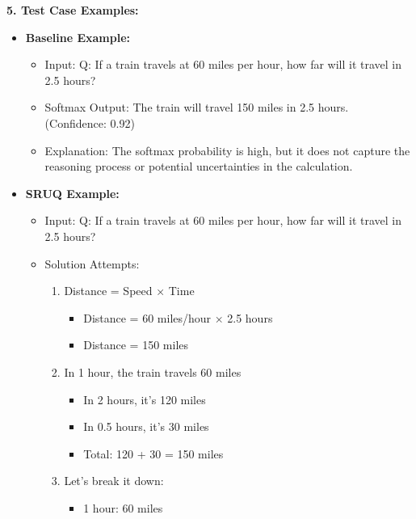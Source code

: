 \newpage


\begin{tcolorbox}[colback=blue!5!white,colframe=blue!75!black,title=\textbf{Semantic Resonance Uncertainty Quantification (SRUQ) (Part 3)}]
\small 
    \textbf{5. Test Case Examples:}
    \begin{itemize}
        \item \textbf{Baseline Example:}
        \begin{itemize}
            \item Input: Q: If a train travels at 60 miles per hour, how far will it travel in 2.5 hours?
            \item Softmax Output: The train will travel 150 miles in 2.5 hours. (Confidence: 0.92)
            \item Explanation: The softmax probability is high, but it does not capture the reasoning process or potential uncertainties in the calculation.
        \end{itemize}
        \item \textbf{SRUQ Example:}
        \begin{itemize}
            \item Input: Q: If a train travels at 60 miles per hour, how far will it travel in 2.5 hours?
            \item Solution Attempts:
            \begin{enumerate}
                \item Distance = Speed × Time
                    \begin{itemize}
                        \item Distance = 60 miles/hour × 2.5 hours
                        \item Distance = 150 miles
                    \end{itemize}
                \item In 1 hour, the train travels 60 miles
                    \begin{itemize}
                        \item In 2 hours, it's 120 miles
                        \item In 0.5 hours, it's 30 miles
                        \item Total: 120 + 30 = 150 miles
                    \end{itemize}
                \item Let's break it down:
                    \begin{itemize}
                        \item 1 hour: 60 miles

\end{itemize}
\end{enumerate}
\end{itemize}
\end{itemize}
\end{tcolorbox}

